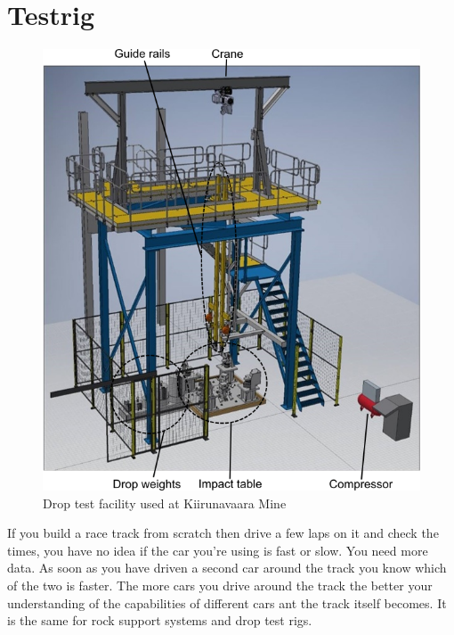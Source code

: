 \chapter{Testrig}



\begin{figure}
\centering
\includegraphics[width=\linewidth]{./pics/rig.png}
\caption{Drop test facility used at Kiirunavaara Mine}
\label{fig:drop}
\end{figure}

If you build a race track from scratch then drive a few laps on it and check the times, you have no idea if the car you're using is fast or slow. You need more data. As soon as you have driven a second car around the track you know which of the two is faster. The more cars you drive around the track the better your understanding of the capabilities of different cars ant the track itself becomes. 
It is the same for rock support systems and drop test rigs.

